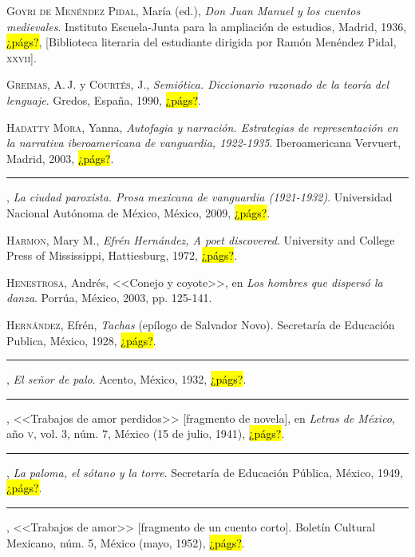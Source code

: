\documentclass[14pt,twoside,final]{extbook} %
\begin{document}
\textsc{Goyri de Menéndez Pidal}, María (ed.), \emph{Don Juan Manuel y los cuentos medievales}. Instituto Escuela-Junta para la ampliación de estudios, Madrid, 1936, \hl{¿págs?}, [Biblioteca literaria del estudiante dirigida por Ramón Menéndez Pidal, \textsc{xxvii}].\label{bib:goyri1936}

\textsc{Greimas}, A.\,J. y \textsc{Courtés}, J., \emph{Semiótica. Diccionario razonado de la teoría del lenguaje}. Gredos, España, 1990, \hl{¿págs?}.\label{bib:greimas1990}

\textsc{Hadatty Mora}, Yanna, \emph{Autofagia y narración. Estrategias de representación en la narrativa iberoamericana de vanguardia, 1922-1935}. Iberoamericana Vervuert, Madrid, 2003, \hl{¿págs?}.\label{bib:hadatty2003}

\rule{1cm}{0.4pt}, \emph{La ciudad paroxista. Prosa mexicana de vanguardia (1921-1932)}. Universidad Nacional Autónoma de México, México, 2009, \hl{¿págs?}.\label{bib:hadatty2009}

\textsc{Harmon}, Mary M., \emph{Efrén Hernández, A poet discovered}. University and College Press of Mississippi, Hattiesburg, 1972, \hl{¿págs?}.\label{bib:harmon1972}

\textsc{Henestrosa}, Andrés, <<Conejo y coyote>>, en \emph{Los hombres que dispersó la danza}. Porrúa, México, 2003, pp. 125-141.\label{bib:henestroza2003}

\textsc{Hernández}, Efrén, \emph{Tachas} (epílogo de Salvador Novo). Secretaría de Educación Publica, México, 1928, \hl{¿págs?}.\label{bib:hernandez1928}

\rule{1cm}{0.4pt}, \emph{El señor de palo}. Acento, México, 1932, \hl{¿págs?}.\label{bib:hernandez1932}

\rule{1cm}{0.4pt}, <<Trabajos de amor perdidos>> [fragmento de novela], en \emph{Letras de México}, año \textsc{v}, vol. 3, núm. 7, México (15 de julio, 1941), \hl{¿págs?}.\label{bib:hernandez1941}

\rule{1cm}{0.4pt}, \emph{La paloma, el sótano y la torre}. Secretaría de Educación Pública, México, 1949, \hl{¿págs?}.\label{bib:hernandez1949}

\rule{1cm}{0.4pt}, <<Trabajos de amor>> [fragmento de un cuento corto]. Boletín Cultural Mexicano, núm. 5, México (mayo, 1952), \hl{¿págs?}.\label{bib:hernandez1952}
\end{document}

